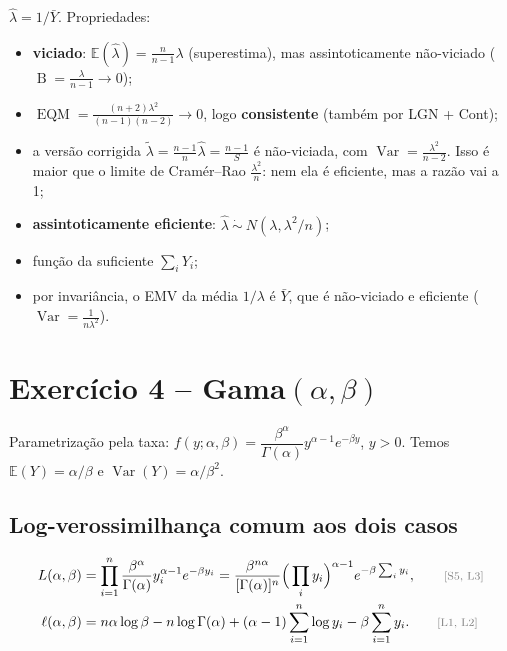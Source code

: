 \documentclass[11pt,a4paper]{article}
\newcommand{\E}{\mathbb{E}}
\newcommand{\Var}{\operatorname{Var}}
\newcommand{\EQM}{\operatorname{EQM}}
\newcommand{\B}{\operatorname{B}}
\newcommand{\bY}{\bar{Y}}
\newcommand{\just}[1]{\tag*{\footnotesize\textcolor{gray}{[#1]}}}
\theoremstyle{definition}
\theoremstyle{plain}
\begin{document}
\begin{resposta}
$\hat\lambda=1/\bY$. Propriedades:
\begin{itemize}[leftmargin=1.2em]
\item \textbf{viciado}: $\E(\hat\lambda)=\frac{n}{n-1}\lambda$ (superestima), mas assintoticamente não-viciado ($\B=\frac{\lambda}{n-1}\to0$);
\item $\EQM=\frac{(n+2)\lambda^2}{(n-1)(n-2)}\to0$, logo \textbf{consistente} (também por LGN + Cont);
\item a versão corrigida $\tilde\lambda=\frac{n-1}{n}\hat\lambda=\frac{n-1}{S}$ é não-viciada, com $\Var=\frac{\lambda^2}{n-2}$. Isso é maior que o limite de Cramér--Rao $\frac{\lambda^2}{n}$: nem ela é eficiente, mas a razão vai a 1;
\item \textbf{assintoticamente eficiente}: $\hat\lambda\ \dot\sim\ N(\lambda,\lambda^2/n)$;
\item função da suficiente $\sum_iY_i$;
\item por invariância, o EMV da média $1/\lambda$ é $\bY$, que é não-viciado e eficiente ($\Var=\frac{1}{n\lambda^2}$).
\end{itemize}
\end{resposta}

\section{Exercício 4 -- Gama$(\alpha,\beta)$}

Parametrização pela taxa: $f(y;\alpha,\beta)=\dfrac{\beta^\alpha}{\Gamma(\alpha)}y^{\alpha-1}e^{-\beta y}$, $y>0$. Temos $\E(Y)=\alpha/\beta$ e $\Var(Y)=\alpha/\beta^2$.

\subsection*{Log-verossimilhança comum aos dois casos}
\begin{align*}
L(\alpha,\beta)&=\prod_{i=1}^n\frac{\beta^\alpha}{\Gamma(\alpha)}y_i^{\alpha-1}e^{-\beta y_i}
=\frac{\beta^{n\alpha}}{[\Gamma(\alpha)]^n}\Big(\prod_iy_i\Big)^{\alpha-1}e^{-\beta\sum_iy_i}, \just{S5, L3}\\
\ell(\alpha,\beta)&=n\alpha\log\beta-n\log\Gamma(\alpha)+(\alpha-1)\sum_{i=1}^n\log y_i-\beta\sum_{i=1}^ny_i . \just{L1, L2}
\end{align*}
\end{document}
